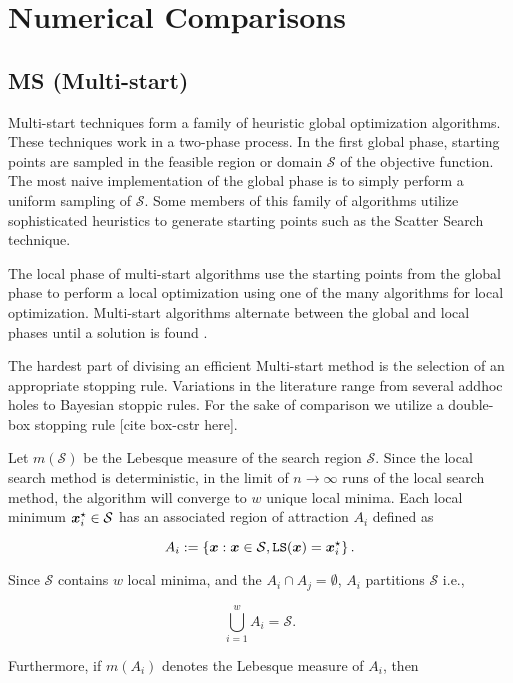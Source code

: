 \section{Numerical Comparisons}
\label{sec:experiments}

\subsection{MS (Multi-start)}
\label{compare:ms}

Multi-start techniques form a family of heuristic global optimization algorithms. These techniques work in a two-phase
process. In the first global phase, starting points are sampled in the feasible region or domain $\mathcal{S}$ of the
objective function. The most naive implementation of the global phase is to simply perform a uniform sampling of $\mathcal{S}$.
Some members of this family of algorithms utilize sophisticated heuristics to generate starting points such as the
Scatter Search technique.

The local phase of multi-start algorithms use the starting points from the global phase to perform a local optimization
using one of the many algorithms for local optimization. Multi-start algorithms alternate between the global and local
phases until a solution is found \cite{Ugray2007ScatterSA}.

The hardest part of divising an efficient Multi-start method is the selection of an appropriate stopping rule.
Variations in the literature range from several addhoc holes to Bayesian stoppic rules. For the sake of comparison
we utilize a double-box stopping rule [cite box-cstr here].

Let $m(\mathcal{S})$ be the Lebesque measure of the search region $\mathcal{S}$. Since the local search method is
deterministic, in the limit of $n\rightarrow \infty$ runs of the local search method, the algorithm will converge
to $w$ unique local minima. Each local minimum $\boldsymbol{x}_i^\star \in\mathcal{S}$ has an associated region of
attraction $A_i$ defined as

$$
A_i := \left\lbrace \boldsymbol{x} : \boldsymbol{x}\in\mathcal{S}, \texttt{LS}(\boldsymbol{x}) = \boldsymbol{x}_i^\star \right\rbrace.
$$

Since $\mathcal{S}$ contains $w$ local minima, and the $A_i\cap A_j=\emptyset$, $A_i$ partitions $\mathcal{S}$ i.e.,

$$
\bigcup_{i=1}^w A_i = \mathcal{S}.
$$

Furthermore, if $m(A_i)$ denotes the Lebesque measure of $A_i$, then

